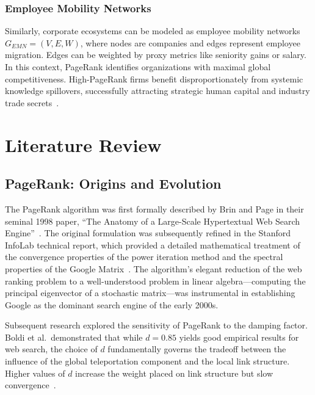 \subsubsection{Employee Mobility Networks}

Similarly, corporate ecosystems can be modeled as employee mobility networks $G_{EMN}=(V,E,W)$, where nodes are companies and edges represent employee migration. Edges can be weighted by proxy metrics like seniority gains or salary. In this context, PageRank identifies organizations with maximal global competitiveness. High-PageRank firms benefit disproportionately from systemic knowledge spillovers, successfully attracting strategic human capital and industry trade secrets~\cite{employee_arxiv, employee_econstor, employee_duke}.


\section{Literature Review}
\label{sec:literature_review}

\subsection{PageRank: Origins and Evolution}
\label{subsec:lit_pagerank}

The PageRank algorithm was first formally described by Brin and Page in their seminal 1998 paper, ``The Anatomy of a Large-Scale Hypertextual Web Search Engine''~\cite{brin1998pagerank}. The original formulation was subsequently refined in the Stanford InfoLab technical report, which provided a detailed mathematical treatment of the convergence properties of the power iteration method and the spectral properties of the Google Matrix~\cite{stanford1999pagerank}. The algorithm's elegant reduction of the web ranking problem to a well-understood problem in linear algebra---computing the principal eigenvector of a stochastic matrix---was instrumental in establishing Google as the dominant search engine of the early 2000s.

Subsequent research explored the sensitivity of PageRank to the damping factor. Boldi et al.\ demonstrated that while $d = 0.85$ yields good empirical results for web search, the choice of $d$ fundamentally governs the tradeoff between the influence of the global teleportation component and the local link structure. Higher values of $d$ increase the weight placed on link structure but slow convergence~\cite{york_lecture_slides}.

